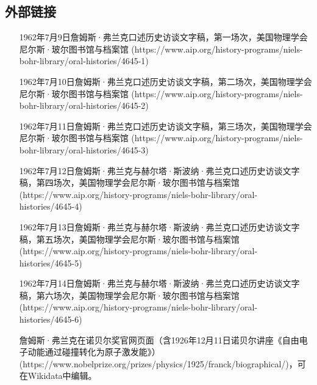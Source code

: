 \subsection{外部链接}
\begin{itemize}
\item  [1962年7月9日詹姆斯·弗兰克口述历史访谈文字稿，第一场次，美国物理学会尼尔斯·玻尔图书馆与档案馆](https://www.aip.org/history-programs/niels-bohr-library/oral-histories/4645-1)
\item  [1962年7月10日詹姆斯·弗兰克口述历史访谈文字稿，第二场次，美国物理学会尼尔斯·玻尔图书馆与档案馆](https://www.aip.org/history-programs/niels-bohr-library/oral-histories/4645-2)
\item  [1962年7月11日詹姆斯·弗兰克口述历史访谈文字稿，第三场次，美国物理学会尼尔斯·玻尔图书馆与档案馆](https://www.aip.org/history-programs/niels-bohr-library/oral-histories/4645-3)
\item  [1962年7月12日詹姆斯·弗兰克与赫尔塔·斯波纳·弗兰克口述历史访谈文字稿，第四场次，美国物理学会尼尔斯·玻尔图书馆与档案馆](https://www.aip.org/history-programs/niels-bohr-library/oral-histories/4645-4)
\item  [1962年7月13日詹姆斯·弗兰克与赫尔塔·斯波纳·弗兰克口述历史访谈文字稿，第五场次，美国物理学会尼尔斯·玻尔图书馆与档案馆](https://www.aip.org/history-programs/niels-bohr-library/oral-histories/4645-5)
\item  [1962年7月14日詹姆斯·弗兰克与赫尔塔·斯波纳·弗兰克口述历史访谈文字稿，第六场次，美国物理学会尼尔斯·玻尔图书馆与档案馆](https://www.aip.org/history-programs/niels-bohr-library/oral-histories/4645-6)
\item  [詹姆斯·弗兰克在诺贝尔奖官网页面（含1926年12月11日诺贝尔讲座《自由电子动能通过碰撞转化为原子激发能》）](https://www.nobelprize.org/prizes/physics/1925/franck/biographical/)，可在Wikidata中编辑。
\end{itemize}